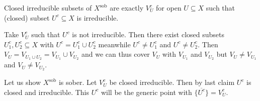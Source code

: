\begin{exercise}{4}
\begin{enumerate}
{                \begin{claim}
                    Closed irreducible subsets of $X^{\text{sob}}$ are exactly
                    $V^c_U$ for open $U \subseteq X$ such
                    that (closed) subset $U^c \subseteq X$ is
                    irreducible.
                \end{claim}
                \begin{proof_claim}
                    Take $V^c_U$ such that $U^c$ is not irreducible. Then there
                    exist closed subsets $U^c_1, U^c_2 \subseteq X$ with $U^c =
                    U^c_1 \cup U^c_2$ meanwhile $U^c \not= U^c_1$ and $U^c \not=
                    U^c_2$. Then $V_U = V_{U_1 \cup U_2} = V_{U_1} \cup V_{U_2}$
                    and we can thus cover $V_U$ with $V_{U_1}$ and $V_{U_2}$ but
                    $V_U \not= V_{U_1}$ and $V_U \not= V_{U_2}$.
                \end{proof_claim}

                Let us show $X^{\text{sob}}$ is sober. Let $V_U^c$ be closed
                irreducible. Then by last claim $U^c$ is closed and irreducible.
                This $U^c$ will be the generic point with $\overline{\{U^c\}} =
                V_U^c$.
            }
    \end{enumerate}
\end{exercise}


